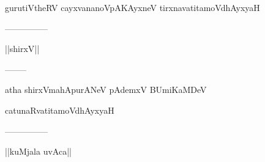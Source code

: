\documentclass{article}
\begin{document}
\begin{center}
gurutiVtheRV cayxvananoVpAKAyxneV tirxnavatitamoVdhAyxyaH
\end{center}

\begin{center}
---------------
\end{center}

\begin{center}
||shirxV||
\end{center}

\begin{center}
--------
\end{center}

\begin{center}
atha shirxVmahApurANeV pAdemxV BUmiKaMDeV
\end{center}

\begin{center}
catunaRvatitamoVdhAyxyaH
\end{center}

\begin{center}
---------------
\end{center}

\begin{center}
||kuMjala uvAca||
\end{center}
\end{document}
